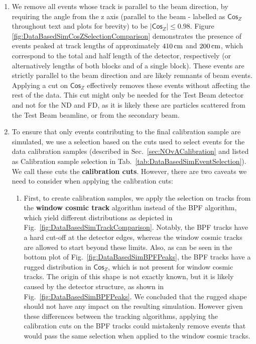 \begin{enumerate}
\item We remove all events whose track is parallel to the beam direction, by requiring the angle from the z axis (parallel to the beam - labelled as $\textsf{Cos}_Z$ throughout text and plots for brevity) to be $|\textsf{Cos}_Z|\leq 0.98$. Figure \ref{fig:DataBasedSimCosZSelectionComparison} demonstrates the presence of events peaked at track lengths of approximately $\unit[410]{cm}$ and $\unit[200]{cm}$, which correspond to the total and half length of the detector, respectively (or alternatively lengths of both blocks and of a single block). These events are strictly parallel to the beam direction and are likely remnants of beam events. Applying a cut on $\textsf{Cos}_Z$ effectively removes these events without affecting the rest of the data. This cut might only be needed for the Test Beam detector and not for the \gls{ND} and \gls{FD}, as it is likely these are particles scattered from the Test Beam beamline, or from the secondary beam.

\item To ensure that only events contributing to the final calibration sample are simulated, we use a selection based on the cuts used to select events for the data calibration samples (described in Sec.~\ref{sec:NOvACalibration} and listed as Calibration sample selection in Tab.~\ref{tab:DataBasedSimEventSelection}). We call these cuts the \textbf{calibration cuts}. However, there are two caveats we need to consider when applying the calibration cuts:
\begin{enumerate}
\item First, to create calibration samples, we apply the selection on tracks from the \textbf{window cosmic track} algorithm instead of the \gls{BPF} algorithm, which yield different distributions as depicted in Fig.~\ref{fig:DataBasedSimTrackComparison}. Notably, the \gls{BPF} tracks have a hard cut-off at the detector edges, whereas the window cosmic tracks are allowed to start beyond these limits. Also, as can be seen in the bottom plot of Fig.~\ref{fig:DataBasedSimBPFPeaks}, the \gls{BPF} tracks have a rugged distribution in $\textsf{Cos}_Z$, which is not present for window cosmic tracks. The origin of this shape is not exactly known, but it is likely caused by the detector structure, as shown in Fig.~\ref{fig:DataBasedSimBPFPeaks}. We concluded that the rugged shape should not have any impact on the resulting simulation. However given these differences between the tracking algorithms, applying the calibration cuts on the \gls{BPF} tracks could mistakenly remove events that would pass the same selection when applied to the window cosmic tracks.


\end{enumerate}
\end{enumerate}
